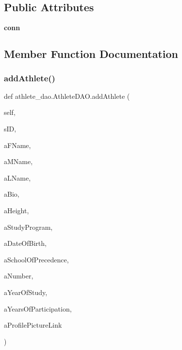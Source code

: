 \subsection*{Public Attributes}
\begin{DoxyCompactItemize}
\item 
\mbox{\label{classathlete__dao_1_1_athlete_d_a_o_a7e0384e08275188212b91e22c2db0322}} 
{\bfseries conn}
\end{DoxyCompactItemize}


\subsection{Member Function Documentation}
\mbox{\label{classathlete__dao_1_1_athlete_d_a_o_a18a987f0007eb0755d274cee8cfd534c}} 
\subsubsection{\texorpdfstring{add\+Athlete()}{addAthlete()}}
{\footnotesize\ttfamily def athlete\+\_\+dao.\+Athlete\+D\+A\+O.\+add\+Athlete (\begin{DoxyParamCaption}\item[{}]{self,  }\item[{}]{s\+ID,  }\item[{}]{a\+F\+Name,  }\item[{}]{a\+M\+Name,  }\item[{}]{a\+L\+Name,  }\item[{}]{a\+Bio,  }\item[{}]{a\+Height,  }\item[{}]{a\+Study\+Program,  }\item[{}]{a\+Date\+Of\+Birth,  }\item[{}]{a\+School\+Of\+Precedence,  }\item[{}]{a\+Number,  }\item[{}]{a\+Year\+Of\+Study,  }\item[{}]{a\+Years\+Of\+Participation,  }\item[{}]{a\+Profile\+Picture\+Link }\end{DoxyParamCaption})}



